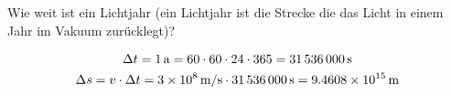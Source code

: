 

\begin{aufgabe}
Wie weit ist ein Lichtjahr (ein Lichtjahr ist die Strecke die das Licht in einem Jahr im Vakuum zurücklegt)?


\begin{loesung}
	\begin{gather*}
\Delta t = \SI{1}{a} = 60 \cdot 60 \cdot 24 \cdot 365 = \SI{31536000}{s}\\
\Delta s = v \cdot \Delta t = \SI{3E8}{m/s} \cdot \SI{31536000}{s}=\SI{9.4608e+15}{m}
	\end{gather*}
\end{loesung}
\end{aufgabe}

